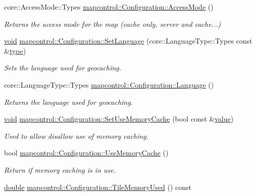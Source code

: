 \begin{DoxyCompactItemize}
core\-::\-Access\-Mode\-::\-Types \hyperlink{group___o_p_map_widget_ga902ee11abd0b7c7634bfbadf5bd73517}{mapcontrol\-::\-Configuration\-::\-Access\-Mode} ()
\begin{DoxyCompactList}\small\item\em Returns the access mode for the map (cache only, server and cache...) \end{DoxyCompactList}\item 
\hyperlink{group___u_a_v_objects_plugin_ga444cf2ff3f0ecbe028adce838d373f5c}{void} \hyperlink{group___o_p_map_widget_ga29b42ec96098c35b537e64d33d6c41b5}{mapcontrol\-::\-Configuration\-::\-Set\-Language} (core\-::\-Language\-Type\-::\-Types const \&\hyperlink{glext_8h_a7d05960f4f1c1b11f3177dc963a45d86}{type})
\begin{DoxyCompactList}\small\item\em Sets the language used for geocaching. \end{DoxyCompactList}\item 
core\-::\-Language\-Type\-::\-Types \hyperlink{group___o_p_map_widget_ga0058ff0ad6bf530d4e7ce0399a14a39c}{mapcontrol\-::\-Configuration\-::\-Language} ()
\begin{DoxyCompactList}\small\item\em Returns the language used for geocaching. \end{DoxyCompactList}\item 
\hyperlink{group___u_a_v_objects_plugin_ga444cf2ff3f0ecbe028adce838d373f5c}{void} \hyperlink{group___o_p_map_widget_ga323ea9b6071044204ce278734ef855fb}{mapcontrol\-::\-Configuration\-::\-Set\-Use\-Memory\-Cache} (bool const \&\hyperlink{glext_8h_aa0e2e9cea7f208d28acda0480144beb0}{value})
\begin{DoxyCompactList}\small\item\em Used to allow disallow use of memory caching. \end{DoxyCompactList}\item 
bool \hyperlink{group___o_p_map_widget_ga07a1c9decb34a05e0337db285bb15bc3}{mapcontrol\-::\-Configuration\-::\-Use\-Memory\-Cache} ()
\begin{DoxyCompactList}\small\item\em Return if memory caching is in use. \end{DoxyCompactList}\item 
\hyperlink{_super_l_u_support_8h_a8956b2b9f49bf918deed98379d159ca7}{double} \hyperlink{group___o_p_map_widget_gaf1e79ea822cc04fd7bc6f9b566c19224}{mapcontrol\-::\-Configuration\-::\-Tile\-Memory\-Used} () const 

\end{DoxyCompactItemize}
